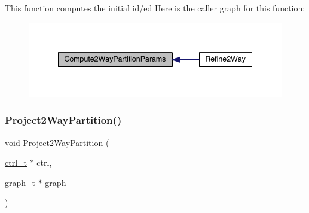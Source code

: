 This function computes the initial id/ed Here is the caller graph for this function\+:\nopagebreak
\begin{figure}[H]
\begin{center}
\leavevmode
\includegraphics[width=342pt]{a00266_a0ed9efb4761e829a24f4066856640f86_icgraph}
\end{center}
\end{figure}
\mbox{\label{a00266_a99814e73a646480f8af05e7d8bcfe4bc}} 
\subsubsection{\texorpdfstring{Project2\+Way\+Partition()}{Project2WayPartition()}}
{\footnotesize\ttfamily void Project2\+Way\+Partition (\begin{DoxyParamCaption}\item[{\hyperlink{a00742}{ctrl\+\_\+t} $\ast$}]{ctrl,  }\item[{\hyperlink{a00734}{graph\+\_\+t} $\ast$}]{graph }\end{DoxyParamCaption})}

